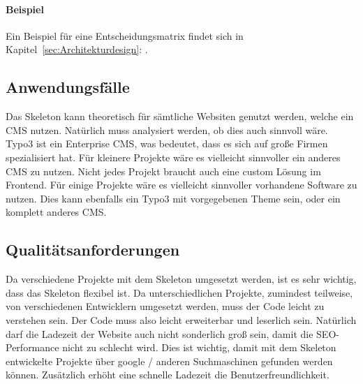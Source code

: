\paragraph{Beispiel}
Ein Beispiel für eine Entscheidungsmatrix findet sich in Kapitel~\ref{sec:Architekturdesign}: .


\subsection{Anwendungsfälle}
\label{sec:Anwendungsfaelle}

Das Skeleton kann theoretisch für sämtliche Websiten genutzt werden, welche ein \acs{CMS} nutzen. Natürlich muss analysiert werden, ob dies auch sinnvoll wäre. Typo3 ist ein Enterprise \acs{CMS}, was bedeutet, dass es sich auf große Firmen spezialisiert hat. Für kleinere Projekte wäre es vielleicht sinnvoller ein anderes \acs{CMS} zu nutzen. Nicht jedes Projekt braucht auch eine custom Lösung im Frontend. Für einige Projekte wäre es vielleicht sinnvoller vorhandene Software zu nutzen. Dies kann ebenfalls ein Typo3 mit vorgegebenen Theme sein, oder ein komplett anderes \acs{CMS}.

\subsection{Qualitätsanforderungen}
\label{sec:Qualitaetsanforderungen}

Da verschiedene Projekte mit dem Skeleton umgesetzt werden, ist es sehr wichtig, dass das Skeleton flexibel ist. Da unterschiedlichen Projekte, zumindest teilweise, von verschiedenen Entwicklern umgesetzt werden, muss der Code leicht zu verstehen sein. Der Code muss also leicht erweiterbar und leserlich sein. 
Natürlich darf die Ladezeit der Website auch nicht sonderlich groß sein, damit die SEO-Performance nicht zu schlecht wird. Dies ist wichtig, damit mit dem Skeleton entwickelte Projekte über google / anderen Suchmaschinen gefunden werden können. Zusätzlich erhöht eine schnelle Ladezeit die Benutzerfreundlichkeit.
